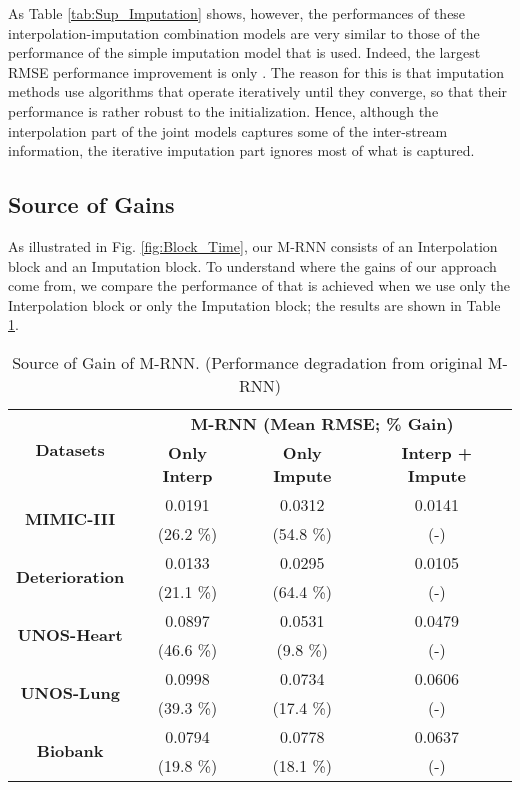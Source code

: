 \documentclass{article}
\begin{document}
As Table \ref{tab:Sup_Imputation} shows, however, the  performances of these interpolation-imputation combination models are very similar to those of the performance of the simple imputation model that is used.  Indeed, the largest RMSE performance improvement is only .  The  reason for this is that imputation methods use algorithms that operate iteratively until they converge, so that their performance is rather robust to the initialization. Hence, although the interpolation part of the joint models captures some of the inter-stream information, the iterative imputation part ignores most of what is captured. 

\subsection{Source of Gains}
As illustrated in Fig. \ref{fig:Block_Time}, our M-RNN consists of an Interpolation block and an Imputation block. To understand where the gains of our approach come from, we compare the performance of that is achieved when we use only the Interpolation block or only the Imputation block; the results are shown in Table \ref{tab:sourceofgain}.

\begin{table}[t!]
	\caption{Source of Gain of M-RNN. (Performance degradation from original M-RNN) }
	\label{tab:sourceofgain}
	\centering
	\small
	\begin{tabular}{c|c|c|c}
		\toprule
		\multirow{2}{*}{\textbf{Datasets}} & \multicolumn{3}{c}{\textbf{M-RNN (Mean RMSE; \% Gain)}}\\
		\cmidrule{2-4}
		& \textbf{Only Interp} & \textbf{Only Impute} & \textbf{Interp + Impute} \\
		\midrule
		\multirow{2}{*}{\textbf{MIMIC-III}} & 0.0191 & 0.0312 & 0.0141 \\
		& (26.2 \%) & (54.8 \%) & (-) \\
		\midrule
		\multirow{2}{*}{\textbf{Deterioration}} & 0.0133 & 0.0295 & 0.0105 \\
		& (21.1 \%) & (64.4 \%) & (-) \\
		\midrule
		\multirow{2}{*}{\textbf{UNOS-Heart}} & 0.0897 & 0.0531 & 0.0479 \\
		& (46.6 \%) & (9.8 \%) & (-) \\
		\midrule
		\multirow{2}{*}{\textbf{UNOS-Lung}} & 0.0998 & 0.0734 & 0.0606 \\
		& (39.3 \%) & (17.4 \%) & (-) \\
		\midrule
		\multirow{2}{*}{\textbf{Biobank}} & 0.0794 & 0.0778 & 0.0637 \\
		& (19.8 \%) & (18.1 \%) & (-) \\
		\bottomrule
	\end{tabular}
\end{table}
\end{document}
